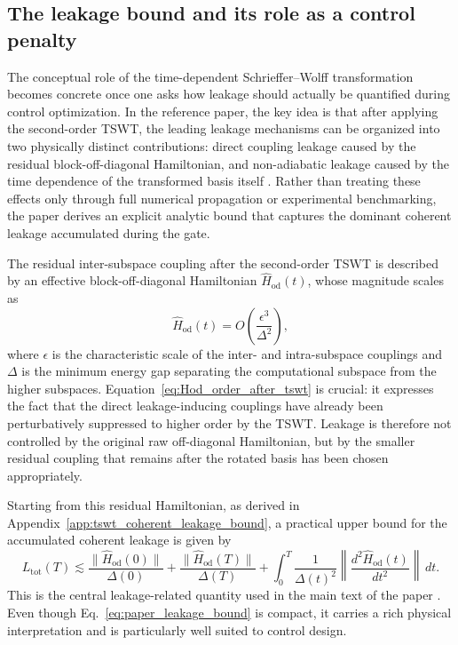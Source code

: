 \subsection{The leakage bound and its role as a control penalty}
\label{subsec:leakage_bound_penalty}

The conceptual role of the time-dependent Schrieffer--Wolff transformation becomes concrete once one asks how leakage should actually be quantified during control optimization. In the reference paper, the key idea is that after applying the second-order TSWT, the leading leakage mechanisms can be organized into two physically distinct contributions: direct coupling leakage caused by the residual block-off-diagonal Hamiltonian, and non-adiabatic leakage caused by the time dependence of the transformed basis itself \cite{Niu2019}. Rather than treating these effects only through full numerical propagation or experimental benchmarking, the paper derives an explicit analytic bound that captures the dominant coherent leakage accumulated during the gate.

The residual inter-subspace coupling after the second-order TSWT is described by an effective block-off-diagonal Hamiltonian $\hat{H}_{\mathrm{od}}(t)$, whose magnitude scales as
\begin{equation}
\hat{H}_{\mathrm{od}}(t)
=
O\!\left(\frac{\epsilon^{3}}{\Delta^{2}}\right),
\label{eq:Hod_order_after_tswt}
\end{equation}
where $\epsilon$ is the characteristic scale of the inter- and intra-subspace couplings and $\Delta$ is the minimum energy gap separating the computational subspace from the higher subspaces. Equation~\eqref{eq:Hod_order_after_tswt} is crucial: it expresses the fact that the direct leakage-inducing couplings have already been perturbatively suppressed to higher order by the TSWT. Leakage is therefore not controlled by the original raw off-diagonal Hamiltonian, but by the smaller residual coupling that remains after the rotated basis has been chosen appropriately.

Starting from this residual Hamiltonian, as derived in Appendix~\ref{app:tswt_coherent_leakage_bound}, a practical upper bound for the accumulated coherent leakage is given by
\begin{equation}
L_{\mathrm{tot}}(T)
\lesssim
\frac{\|\hat{H}_{\mathrm{od}}(0)\|}{\Delta(0)}
+
\frac{\|\hat{H}_{\mathrm{od}}(T)\|}{\Delta(T)}
+
\int_{0}^{T}
\frac{1}{\Delta(t)^{2}}
\left\|
\frac{d^{2}\hat{H}_{\mathrm{od}}(t)}{dt^{2}}
\right\|
\,dt.
\label{eq:paper_leakage_bound}
\end{equation}
This is the central leakage-related quantity used in the main text of the paper \cite{Niu2019}. Even though Eq.~\eqref{eq:paper_leakage_bound} is compact, it carries a rich physical interpretation and is particularly well suited to control design.

